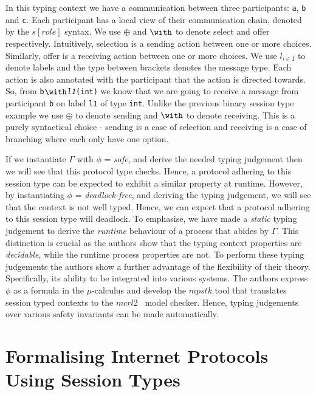 \documentclass{article}
\newcommand{\type}[1]{\texttt{#1}}
\begin{document}
In this typing context we have a communication between three participants: \type{a}, \type{b} and \type{c}.
Each participant has a local view of their communication chain, denoted by the \ensuremath{s[role]} syntax.
We use \ensuremath{\oplus} and \ensuremath{\with} to denote select and offer respectively.
Intuitively, selection is a sending action between one or more choices.
Similarly, offer is a receiving action between one or more choices.
We use \ensuremath{l_{i \in I}} to denote labels and the type between brackets denotes the message type.
Each action is also annotated with the participant that the action is directed towards.
So, from \type{b\ensuremath{\with}\textit{l1}(int)} we know that we are going to receive a message from participant \type{b} on label \type{l1} of type \type{int}.
Unlike the previous binary session type example we use \type{\ensuremath{\oplus}} to denote sending and \type{\ensuremath{\with}} to denote receiving.
This is a purely syntactical choice - sending is a case of selection and receiving is a case of branching where each only have one option.

If we instantiate \type{\ensuremath{\Gamma}} with \type{\ensuremath{\phi}} = \textit{safe}, and derive the needed typing judgement then we will see that this protocol type checks.
Hence, a protocol adhering to this session type can be expected to exhibit a similar property at runtime. 
However, by instantiating \type{\ensuremath{\phi}} = \textit{deadlock-free}, and deriving the typing judgement, we will see that the context is not well typed.
Hence, we can expect that a protocol adhering to this session type will deadlock.
To emphasise, we have made a \textit{static} typing judgement to derive the \textit{runtime} behaviour of a process that abides by \type{\ensuremath{\Gamma}}.
This distinction is crucial as the authors show that the typing context properties are \textit{decidable}, while the runtime process properties are not.
To perform these typing judgements the authors show a further advantage of the flexibility of their theory.
Specifically, its ability to be integrated into various systems.
The authors express \type{\ensuremath{\phi}} as a formula in the \type{\ensuremath{\mu}}-calculus and develop the \ensuremath{mpstk} tool that translates session typed contexts to the \ensuremath{mcrl2}~\cite{BGKLNVWWW19} model checker.
Hence, typing judgements over various safety invariants can be made automatically.

\section{Formalising Internet Protocols Using Session Types}
\end{document}
